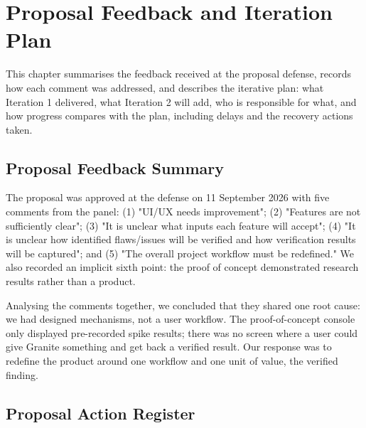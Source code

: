 \chapter{Proposal Feedback and Iteration Plan}

This chapter summarises the feedback received at the proposal defense, records how each comment was addressed, and describes the iterative plan: what Iteration 1 delivered, what Iteration 2 will add, who is responsible for what, and how progress compares with the plan, including delays and the recovery actions taken.

\section{Proposal Feedback Summary}

The proposal was approved at the defense on 11 September 2026 with five comments from the panel: (1) "UI/UX needs improvement"; (2) "Features are not sufficiently clear"; (3) "It is unclear what inputs each feature will accept"; (4) "It is unclear how identified flaws/issues will be verified and how verification results will be captured"; and (5) "The overall project workflow must be redefined." We also recorded an implicit sixth point: the proof of concept demonstrated research results rather than a product.

Analysing the comments together, we concluded that they shared one root cause: we had designed mechanisms, not a user workflow. The proof-of-concept console only displayed pre-recorded spike results; there was no screen where a user could give Granite something and get back a verified result. Our response was to redefine the product around one workflow and one unit of value, the verified finding.

\section{Proposal Action Register}

